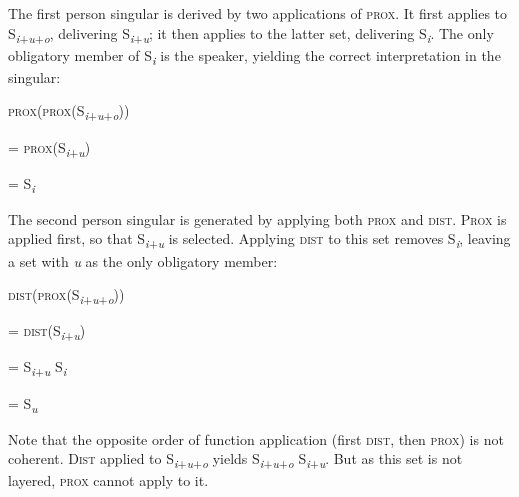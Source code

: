 \documentclass[output=paper]{langsci/langscibook}
\begin{document}
 The first person singular is derived by two applications of \textsc{prox}. It first applies to S\textit{\textsubscript{i}}\textsubscript{+}\textit{\textsubscript{u}}\textsubscript{+}\textit{\textsubscript{o}}, delivering S\textit{\textsubscript{i}}\textsubscript{+}\textit{\textsubscript{u}}; it then applies to the latter set, delivering S\textit{\textsubscript{i}}. The only obligatory member of S\textit{\textsubscript{i}} is the speaker, yielding the correct interpretation in the singular:

\settowidth{}
\ea 
    \textsc{prox}(\textsc{prox}(S\textit{\textsubscript{i}}\textsubscript{+}\textit{\textsubscript{u}}\textsubscript{+}\textit{\textsubscript{o}}))    

    = \textsc{prox}(S\textit{\textsubscript{i}}\textsubscript{+}\textit{\textsubscript{u}})        

    = S\textit{\textsubscript{i}}          
\z

The second person singular is generated by applying both \textsc{prox} and \textsc{dist}. \textsc{Prox} is applied first, so that S\textit{\textsubscript{i}}\textsubscript{+}\textit{\textsubscript{u}} is selected. Applying \textsc{dist} to this set removes S\textit{\textsubscript{i}}, leaving a set with \textit{u} as the only obligatory member:

\ea 
     \textsc{dist}(\textsc{prox}(S\textit{\textsubscript{i}}\textsubscript{+}\textit{\textsubscript{u}}\textsubscript{+}\textit{\textsubscript{o}}))    

    = \textsc{dist}(S\textit{\textsubscript{i}}\textsubscript{+}\textit{\textsubscript{u}})        

    = S\textit{\textsubscript{i}}\textsubscript{+}\textit{\textsubscript{u}} \textminus{} S\textit{\textsubscript{i}}        

    = S\textit{\textsubscript{u}}
\z



Note that the opposite order of function application (first \textsc{dist}, then \textsc{prox}) is not coherent. \textsc{Dist} applied to S\textit{\textsubscript{i}}\textsubscript{+}\textit{\textsubscript{u}}\textsubscript{+}\textit{\textsubscript{o}} yields S\textit{\textsubscript{i}}\textsubscript{+}\textit{\textsubscript{u}}\textsubscript{+}\textit{\textsubscript{o}} \textminus{} S\textit{\textsubscript{i}}\textsubscript{+}\textit{\textsubscript{u}}. But as this set is not layered, \textsc{prox} cannot apply to it.
\end{document}
